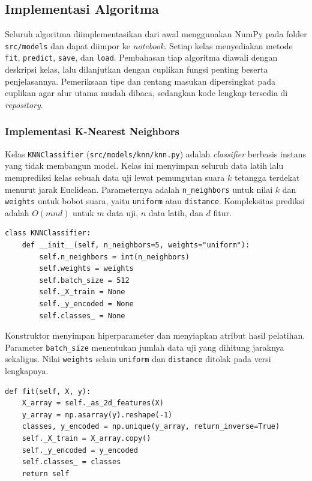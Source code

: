 \subsection{Implementasi Algoritma}

Seluruh algoritma diimplementasikan dari awal menggunakan NumPy pada folder
\texttt{src/models} dan dapat diimpor ke \textit{notebook}. Setiap kelas
menyediakan metode \texttt{fit}, \texttt{predict}, \texttt{save}, dan
\texttt{load}. Pembahasan tiap algoritma diawali dengan deskripsi kelas, lalu
dilanjutkan dengan cuplikan fungsi penting beserta penjelasannya. Pemeriksaan
tipe dan rentang masukan dipersingkat pada cuplikan agar alur utama mudah
dibaca, sedangkan kode lengkap tersedia di \textit{repository}.

\subsubsection{Implementasi K-Nearest Neighbors}

Kelas \texttt{KNNClassifier} (\texttt{src/models/knn/knn.py}) adalah
\textit{classifier} berbasis instans yang tidak membangun model. Kelas ini
menyimpan seluruh data latih lalu memprediksi kelas sebuah data uji lewat
pemungutan suara $k$ tetangga terdekat menurut jarak Euclidean. Parameternya
adalah \texttt{n\_neighbors} untuk nilai $k$ dan \texttt{weights} untuk bobot
suara, yaitu \texttt{uniform} atau \texttt{distance}. Kompleksitas prediksi
adalah $O(mnd)$ untuk $m$ data uji, $n$ data latih, dan $d$ fitur.

\begin{lstlisting}
class KNNClassifier:
    def __init__(self, n_neighbors=5, weights="uniform"):
        self.n_neighbors = int(n_neighbors)
        self.weights = weights
        self.batch_size = 512
        self._X_train = None
        self._y_encoded = None
        self.classes_ = None
\end{lstlisting}

Konstruktor menyimpan hiperparameter dan menyiapkan atribut hasil pelatihan.
Parameter \texttt{batch\_size} menentukan jumlah data uji yang dihitung
jaraknya sekaligus. Nilai \texttt{weights} selain \texttt{uniform} dan
\texttt{distance} ditolak pada versi lengkapnya.

\begin{lstlisting}
def fit(self, X, y):
    X_array = self._as_2d_features(X)
    y_array = np.asarray(y).reshape(-1)
    classes, y_encoded = np.unique(y_array, return_inverse=True)
    self._X_train = X_array.copy()
    self._y_encoded = y_encoded
    self.classes_ = classes
    return self
\end{lstlisting}

